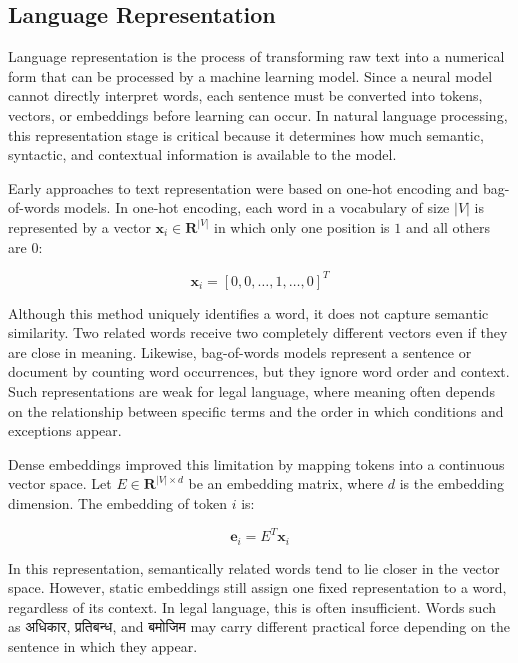 \documentclass[12pt]{report}
\begin{document}
\subsection{Language Representation}

Language representation is the process of transforming raw text into a numerical form that can be processed by a machine learning model. Since a neural model cannot directly interpret words, each sentence must be converted into tokens, vectors, or embeddings before learning can occur. In natural language processing, this representation stage is critical because it determines how much semantic, syntactic, and contextual information is available to the model.

Early approaches to text representation were based on one-hot encoding and bag-of-words models. In one-hot encoding, each word in a vocabulary of size $|V|$ is represented by a vector $\mathbf{x}_i \in \mathbf{R}^{|V|}$ in which only one position is $1$ and all others are $0$:

\begin{equation}
\mathbf{x}_i = [0,0,\dots,1,\dots,0]^T
\end{equation}

Although this method uniquely identifies a word, it does not capture semantic similarity. Two related words receive two completely different vectors even if they are close in meaning. Likewise, bag-of-words models represent a sentence or document by counting word occurrences, but they ignore word order and context. Such representations are weak for legal language, where meaning often depends on the relationship between specific terms and the order in which conditions and exceptions appear.

Dense embeddings improved this limitation by mapping tokens into a continuous vector space. Let $E \in \mathbf{R}^{|V| \times d}$ be an embedding matrix, where $d$ is the embedding dimension. The embedding of token $i$ is:

\begin{equation}
\mathbf{e}_i = E^T \mathbf{x}_i
\end{equation}

In this representation, semantically related words tend to lie closer in the vector space. However, static embeddings still assign one fixed representation to a word, regardless of its context. In legal language, this is often insufficient. Words such as {\devanagarifont अधिकार}, {\devanagarifont प्रतिबन्ध}, and {\devanagarifont बमोजिम} may carry different practical force depending on the sentence in which they appear.
\end{document}
